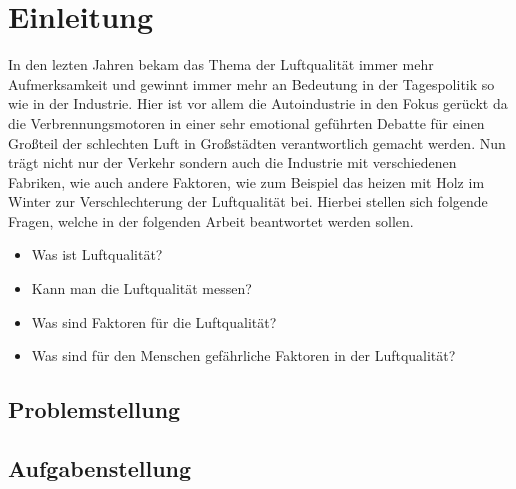 
\chapter{Einleitung}\label{cha:Einleitung}
In den lezten Jahren bekam das Thema der Luftqualität immer mehr Aufmerksamkeit und gewinnt immer mehr an Bedeutung in der Tagespolitik so wie in der Industrie. Hier ist vor allem die Autoindustrie in den Fokus gerückt da die Verbrennungsmotoren in einer sehr emotional geführten Debatte für einen Großteil der schlechten Luft in Großstädten verantwortlich gemacht werden. Nun trägt nicht nur der Verkehr sondern auch die Industrie mit verschiedenen Fabriken, wie auch andere Faktoren, wie zum Beispiel das heizen mit Holz im Winter zur Verschlechterung der Luftqualität bei.  
\newline
Hierbei stellen sich folgende Fragen, welche in der folgenden Arbeit beantwortet werden sollen.
\begin{itemize}
	\item Was ist Luftqualität?
	\item Kann man die Luftqualität messen?
	\item Was sind Faktoren für die Luftqualität?
	\item Was sind für den Menschen gefährliche Faktoren in der Luftqualität?
\end{itemize}	
 
 \section{Problemstellung}\label{sec:Problemstellung}
\section{Aufgabenstellung}\label{sec:Aufgabenstellung}